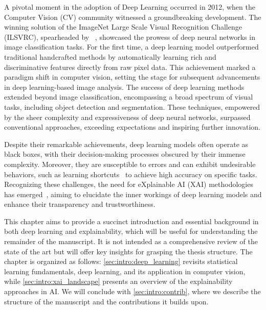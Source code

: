 A pivotal moment in the adoption of Deep Learning occurred in 2012, when the Computer Vision (CV) community witnessed a groundbreaking development. The winning solution of the ImageNet Large Scale Visual Recognition Challenge (ILSVRC), spearheaded by ~\cite{krizhevsky2012imagenet}, showcased the prowess of deep neural networks in image classification tasks. For the first time, a deep learning model outperformed traditional handcrafted methods by automatically learning rich and discriminative features directly from raw pixel data. This achievement marked a paradigm shift in computer vision, setting the stage for subsequent advancements in deep learning-based image analysis.
The success of deep learning methods extended beyond image classification, encompassing a broad spectrum of visual tasks, including object detection and segmentation. These techniques, empowered by the sheer complexity and expressiveness of deep neural networks, surpassed conventional approaches, exceeding expectations and inspiring further innovation.

Despite their remarkable achievements, deep learning models often operate as black boxes, with their decision-making processes obscured by their immense complexity. Moreover, they are susceptible to errors and can exhibit undesirable behaviors, such as learning shortcuts~\cite{geirhos2020shortcut} to achieve high accuracy on specific tasks. Recognizing these challenges, the need for eXplainable AI (XAI) methodologies has emerged~\cite{doshivelez2017rigorous}, aiming to elucidate the inner workings of deep learning models and enhance their transparency and trustworthiness.

This chapter aims to provide a succinct introduction and essential background in both deep learning and explainability, which will be useful for understanding the remainder of the manuscript. It is not intended as a comprehensive review of the state of the art but will offer key insights for grasping the thesis structure. The chapter is organized as follows: \autoref{sec:intro:deep_learning} revisits statistical learning fundamentals, deep learning, and its application in computer vision, while \autoref{sec:intro:xai_landscape} presents an overview of the explainability approaches in AI. We will conclude with \autoref{sec:intro:contrib}, where we describe the structure of the manuscript and the contributions it builds upon.








